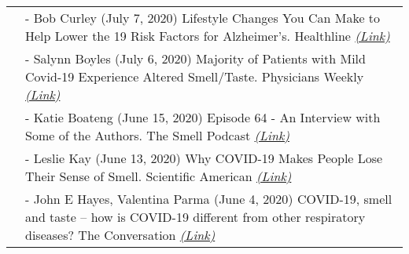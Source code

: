 \documentclass[11pt]{cooperCV_v1/cooperCV} %
\begin{document}
\begin{minipage}{\textwidth}







\begin{tabular}{ @{} p{} p{} @{} }
  
  \small \textcolor{gray}{{\emph{ }}} & 
  - {\small Bob Curley (July 7, 2020) Lifestyle Changes You Can Make to Help Lower the 19 Risk Factors for Alzheimer’s. Healthline } \footnotesize \textcolor{gray}{\href{https://www.healthline.com/health-news/alzheimers-risk-factors-lifestyle-changes\#The-impact-of-lifestyle}{\emph{(Link)}}} \\
  
  \small \textcolor{gray}{{\emph{ }}} & 
  - {\small Salynn Boyles (July 6, 2020) Majority of Patients with Mild Covid-19 Experience Altered Smell/Taste. Physicians Weekly } \footnotesize \textcolor{gray}{\href{https://www.physiciansweekly.com/majority-of-patients-with-mild-covid-19-experience-altered-smell-taste/}{\emph{(Link)}}} \\
  
  \small \textcolor{gray}{{\emph{ }}} & 
  - {\small Katie Boateng (June 15, 2020) Episode 64 - An Interview with Some of the Authors. The Smell Podcast } \footnotesize \textcolor{gray}{\href{https://podcasts.apple.com/us/podcast/the-smell-podcast/id1429270582?i=1000477261620}{\emph{(Link)}}} \\
  
  \small \textcolor{gray}{{\emph{ }}} & 
  - {\small Leslie Kay (June 13, 2020) Why COVID-19 Makes People Lose Their Sense of Smell. Scientific American } \footnotesize \textcolor{gray}{\href{https://www.scientificamerican.com/article/why-covid-19-makes-people-lose-their-sense-of-smell1/}{\emph{(Link)}}} \\
  
  \small \textcolor{gray}{{\emph{ }}} & 
  - {\small John E Hayes, Valentina Parma (June 4, 2020) COVID-19, smell and taste – how is COVID-19 different from other respiratory diseases? The Conversation } \footnotesize \textcolor{gray}{\href{https://theconversation.com/covid-19-smell-and-taste-how-is-covid-19-different-from-other-respiratory-diseases-139543}{\emph{(Link)}}} \\
  

\end{tabular}
\end{minipage}
\end{document}
